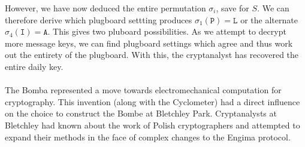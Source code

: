 \noindent However, we have now deduced the entire permutation
$\sigma_i$, save for $S$. We can therefore derive which plugboard
settting produces $\sigma_1(\texttt{P}) = \texttt{L}$ or the
alternate $\sigma_4(\texttt{I}) = \texttt{A}$. This gives two
pluboard possibilities. As we attempt to decrypt more message keys,
we can find plugboard settings which agree and thus work out the
entirety of the plugboard. With this, the cryptanalyst has recovered
the entire daily key.
\\\\The Bomba represented a move towards electromechanical
computation for cryptography. This invention (along with the
Cyclometer) had a direct influence on the choice to construct the
Bombe at Bletchley Park. Cryptanalysts at Bletchley had known about
the work of Polish cryptographers and attempted to expand their
methods in the face of complex changes to the Engima protocol.

